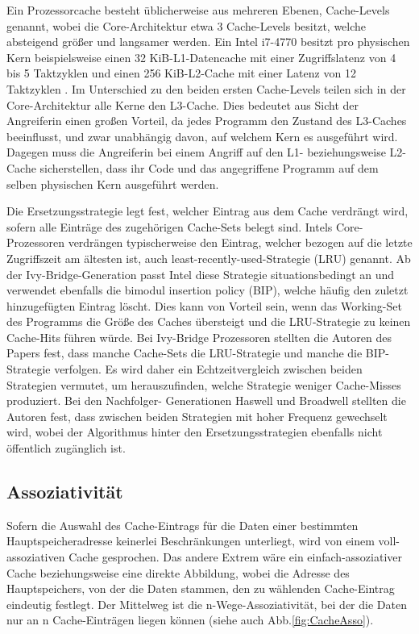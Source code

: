 Ein Prozessorcache besteht üblicherweise aus mehreren Ebenen, Cache-Levels genannt, wobei die Core-Architektur etwa 3 Cache-Levels besitzt, welche absteigend größer und langsamer werden. Ein Intel i7-4770 besitzt pro physischen Kern beispielsweise einen 32 KiB-L1-Datencache mit einer Zugriffslatenz von 4 bis 5 Taktzyklen und einen 256 KiB-L2-Cache mit einer Latenz von 12 Taktzyklen \cite{CacheStatsHaswell}.
Im Unterschied zu den beiden ersten Cache-Levels teilen sich in der Core-Architektur alle Kerne den L3-Cache. 
Dies bedeutet aus Sicht der Angreiferin einen großen Vorteil, da jedes Programm den Zustand des L3-Caches beeinflusst, und zwar unabhängig davon, auf welchem Kern es ausgeführt wird.
Dagegen muss die Angreiferin bei einem Angriff auf den L1- beziehungsweise L2-Cache sicherstellen, dass ihr Code und das angegriffene Programm auf dem selben physischen Kern ausgeführt werden.

Die Ersetzungsstrategie legt fest, welcher Eintrag aus dem Cache verdrängt wird, sofern alle Einträge des zugehörigen Cache-Sets belegt sind. 
Intels Core-Prozessoren verdrängen typischerweise den Eintrag, welcher bezogen auf die letzte Zugriffszeit am ältesten ist, auch least-recently-used-Strategie (LRU) genannt. 
Ab der Ivy-Bridge-Generation passt Intel diese Strategie situationsbedingt an \cite{CacheReplacementPolicy} und verwendet ebenfalls  die bimodul insertion policy (BIP), welche häufig den zuletzt hinzugefügten Eintrag löscht. 
Dies kann von Vorteil sein, wenn das Working-Set des Programms die Größe des Caches übersteigt und die LRU-Strategie zu keinen Cache-Hits führen würde.
Bei Ivy-Bridge Prozessoren stellten die Autoren des Papers fest, dass manche Cache-Sets die LRU-Strategie und manche die BIP-Strategie verfolgen. 
Es wird daher ein Echtzeitvergleich zwischen beiden Strategien vermutet, um herauszufinden, welche Strategie weniger Cache-Misses produziert. 
Bei den Nachfolger- Generationen Haswell und Broadwell stellten die Autoren fest, dass zwischen beiden Strategien mit hoher Frequenz gewechselt wird, wobei der Algorithmus hinter den Ersetzungsstrategien ebenfalls nicht öffentlich zugänglich ist.

\subsection{Assoziativität}

\newtext

Sofern die Auswahl des Cache-Eintrags für die Daten einer bestimmten Hauptspeicheradresse keinerlei Beschränkungen unterliegt, wird von einem voll-assoziativen Cache gesprochen. 
Das andere Extrem wäre ein einfach-assoziativer Cache beziehungsweise eine direkte Abbildung, wobei die Adresse des Hauptspeichers, von der die Daten stammen, den zu wählenden Cache-Eintrag eindeutig festlegt.
Der Mittelweg ist die n-Wege-Assoziativität, bei der die Daten nur an n Cache-Einträgen liegen können (siehe auch Abb.\ref{fig:CacheAsso}).

